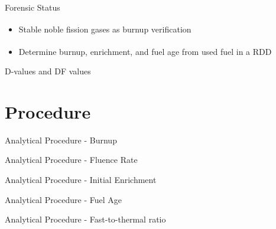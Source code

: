 \documentclass{beamer}
\newcommand{\tss}{\textsuperscript}
\begin{document}
\begin{frame}{Forensic Status}
  \begin{itemize}
  \item{Stable noble fission gases as burnup verification\tss{\cite{RN114}}}
  \item{Determine burnup, enrichment, and fuel age from used fuel in a RDD\tss{\cite{}}}
  \end{itemize}
\end{frame}


\begin{frame}{D-values and DF values}

\end{frame}


\section{Procedure}
\begin{frame}
  \sectionpage
\end{frame}

\begin{frame}{Analytical Procedure - Burnup}

\end{frame}

\begin{frame}{Analytical Procedure - Fluence Rate}

\end{frame}

\begin{frame}{Analytical Procedure - Initial Enrichment}

\end{frame}

\begin{frame}{Analytical Procedure - Fuel Age}

\end{frame}

\begin{frame}{Analytical Procedure - Fast-to-thermal ratio}

\end{frame}
\end{document}
